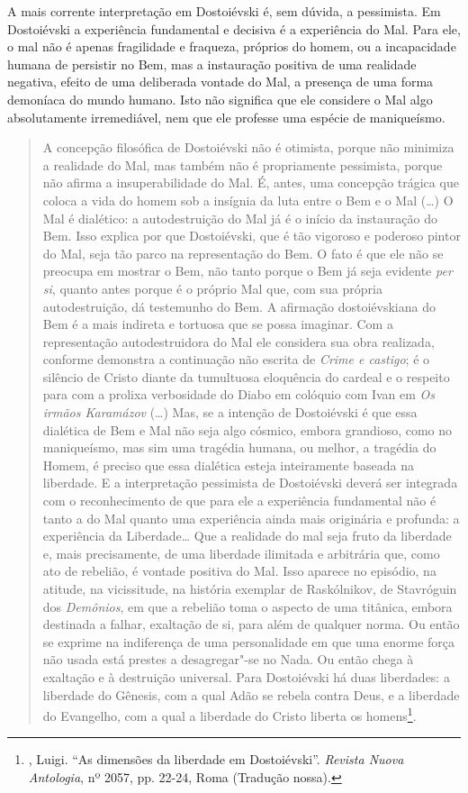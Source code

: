 A mais corrente interpretação em Dostoiévski é, sem dúvida, a
pessimista. Em Dostoiévski a experiência fundamental e decisiva é a
experiência do Mal. Para ele, o mal não é apenas fragilidade e fraqueza,
próprios do homem, ou a incapacidade humana de persistir no Bem, mas a
instauração positiva de uma realidade negativa, efeito de uma deliberada
vontade do Mal, a presença de uma forma demoníaca do mundo humano. Isto
não significa que ele considere o Mal algo absolutamente irremediável,
nem que ele professe uma espécie de maniqueísmo.

\begin{quote}
A concepção filosófica de Dostoiévski não é otimista, porque não
minimiza a realidade do Mal, mas também não é propriamente pessimista,
porque não afirma a insuperabilidade do Mal. É, antes, uma concepção
trágica que coloca a vida do homem sob a insígnia da luta entre o Bem e
o Mal (\ldots{}) O Mal é dialético: a autodestruição do Mal já é o início da
instauração do Bem. Isso explica por que Dostoiévski, que é tão vigoroso
e poderoso pintor do Mal, seja tão parco na representação do Bem. O fato
é que ele não se preocupa em mostrar o Bem, não tanto porque o Bem já
seja evidente \emph{per si}, quanto antes porque é o próprio Mal que,
com sua própria autodestruição, dá testemunho do Bem. A afirmação
dostoiévskiana do Bem é a mais indireta e tortuosa que se possa
imaginar. Com a representação autodestruidora do Mal ele considera sua
obra realizada, conforme demonstra a continuação não escrita de
\emph{Crime e castigo}; é o silêncio de Cristo diante da tumultuosa
eloquência do cardeal e o respeito para com a prolixa verbosidade do
Diabo em colóquio com Ivan em \emph{Os irmãos Karamázov} (\ldots{}) Mas, se a
intenção de Dostoiévski é que essa dialética de Bem e Mal não seja algo
cósmico, embora grandioso, como no maniqueísmo, mas sim uma tragédia
humana, ou melhor, a tragédia do Homem, é preciso que essa dialética
esteja inteiramente baseada na liberdade. E a interpretação pessimista
de Dostoiévski deverá ser integrada com o reconhecimento de que para ele
a experiência fundamental não é tanto a do Mal quanto uma experiência
ainda mais originária e profunda: a experiência da Liberdade\ldots{} Que a
realidade do mal seja fruto da liberdade e, mais precisamente, de uma
liberdade ilimitada e arbitrária que, como ato de rebelião, é vontade
positiva do Mal. Isso aparece no episódio, na atitude, na vicissitude,
na história exemplar de Raskólnikov, de Stavróguin dos \emph{Demônios},
em que a rebelião toma o aspecto de uma titânica, embora destinada a
falhar, exaltação de si, para além de qualquer norma. Ou então se
exprime na indiferença de uma personalidade em que uma enorme força não
usada está prestes a desagregar"-se no Nada. Ou então chega à exaltação e
à destruição universal. Para Dostoiévski há duas liberdades: a liberdade
do Gênesis, com a qual Adão se rebela contra Deus, e a liberdade do
Evangelho, com a qual a liberdade do Cristo liberta os homens\footnote{,
  Luigi. ``As dimensões da liberdade em Dostoiévski''. \emph{Revista Nuova
  Antologia}, nº 2057, pp. 22-24, Roma (Tradução nossa).}.
\end{quote}

